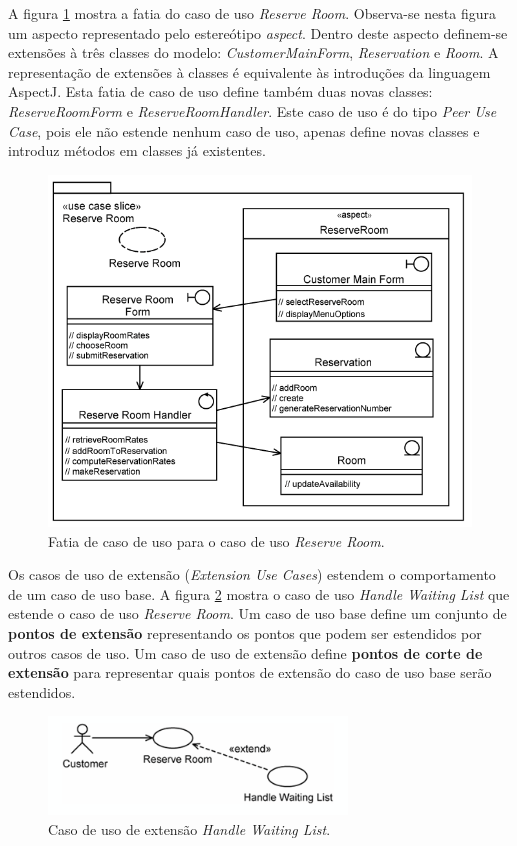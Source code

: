 A figura \ref{fig:jacobson_reserve_room_slice} mostra a fatia do caso de uso \textit{Reserve Room}. Observa-se nesta figura um aspecto representado
pelo estereótipo \textit{aspect}. Dentro deste aspecto definem-se extensões à três classes do modelo: \textit{CustomerMainForm}, \textit{Reservation}
e \textit{Room}. A representação de extensões à classes é equivalente às introduções da linguagem AspectJ. Esta fatia de caso de uso define também
duas novas classes: \textit{ReserveRoomForm} e \textit{ReserveRoomHandler}. Este caso de uso é do tipo \textit{Peer Use Case}, pois ele não estende
nenhum caso de uso, apenas define novas classes e introduz métodos em classes já existentes.

\begin{figure}
	\centering
	\includegraphics[width=450px]{img/jacobson_reserve_room_slice.png}
	\caption{Fatia de caso de uso para o
	caso de uso \textit{Reserve Room}.}\label{fig:jacobson_reserve_room_slice}
\end{figure}

Os casos de uso de extensão (\textit{Extension Use Cases}) estendem o comportamento de um caso de uso base. A figura
\ref{fig:jacobson_use_case_extension} mostra o caso de uso \textit{Handle Waiting List} que estende o caso de uso \textit{Reserve Room}. Um caso de
uso base define um conjunto de \textbf{pontos de extensão} representando os pontos que podem ser estendidos por outros casos de uso. Um caso de uso de
extensão define \textbf{pontos de corte de extensão} para representar quais pontos de extensão do caso de uso base serão estendidos. 

\begin{figure}
	\centering
	\includegraphics[width=300px]{img/jacobson_use_case_extension.png}
	\caption{Caso de uso de extensão
	\textit{Handle Waiting List}.}\label{fig:jacobson_use_case_extension}
\end{figure}

